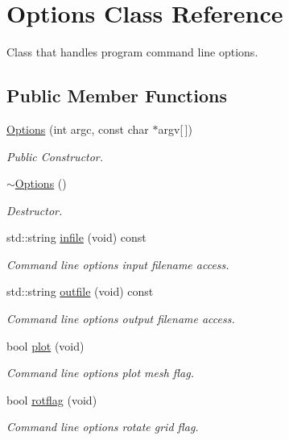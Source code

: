\hypertarget{class_options}{}\section{Options Class Reference}
\label{class_options}


Class that handles program command line options.  


\subsection*{Public Member Functions}
\begin{DoxyCompactItemize}
\item 
\mbox{\hyperlink{class_options_af65f2f452a673db877590dbff53115ff}{Options}} (int argc, const char $\ast$argv\mbox{[}$\,$\mbox{]})
\begin{DoxyCompactList}\small\item\em Public Constructor. \end{DoxyCompactList}\item 
\mbox{\hyperlink{class_options_a86ddb85b183f8b58af5481f30a42fa92}{$\sim$\+Options}} ()
\begin{DoxyCompactList}\small\item\em Destructor. \end{DoxyCompactList}\item 
std\+::string \mbox{\hyperlink{class_options_af5fc0ecb4b117c5438f07762fa7f565a}{infile}} (void) const
\begin{DoxyCompactList}\small\item\em Command line options input filename access. \end{DoxyCompactList}\item 
std\+::string \mbox{\hyperlink{class_options_a35e8029289fef81902b98422e5b9aff8}{outfile}} (void) const
\begin{DoxyCompactList}\small\item\em Command line options output filename access. \end{DoxyCompactList}\item 
bool \mbox{\hyperlink{class_options_a6d00df300abbec9c39990eb8858f1255}{plot}} (void)
\begin{DoxyCompactList}\small\item\em Command line options plot mesh flag. \end{DoxyCompactList}\item 
bool \mbox{\hyperlink{class_options_a896737c665d9c0ee7a17a0cdedf66bb7}{rotflag}} (void)
\begin{DoxyCompactList}\small\item\em Command line options rotate grid flag. \end{DoxyCompactList}\end{DoxyCompactItemize}
